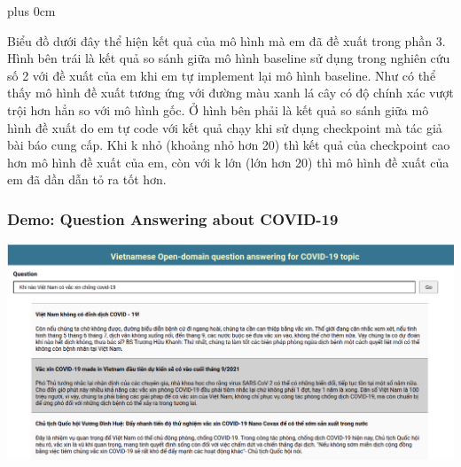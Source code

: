 \documentclass[11pt]{beamer}
\renewcommand{\raggedright}{\leftskip=0pt \rightskip=0pt plus 0cm}
\let\olditemize=\itemize
\renewenvironment{itemize}{\olditemize\raggedright}{\endlist}
\begin{document}
\begin{frame}
\begin{itemize}
	\item Biểu đồ dưới đây thể hiện kết quả của mô hình mà em đã đề xuất trong phần 3. Hình bên trái là kết quả so sánh giữa mô hình baseline sử dụng trong nghiên cứu số 2 với đề xuất của em khi em tự implement lại mô hình baseline. Như có thể thấy mô hình đề xuất tương ứng với đường màu xanh lá cây có độ chính xác vượt trội hơn hẳn so với mô hình gốc. Ở hình bên phải là kết quả so sánh giữa mô hình đề xuất do em tự code với kết quả chạy khi sử dụng checkpoint mà tác giả bài báo cung cấp. Khi k nhỏ (khoảng nhỏ hơn 20) thì kết quả của checkpoint cao hơn mô hình đề xuất của em, còn với k lớn (lớn hơn 20) thì mô hình đề xuất của em đã dần dẫn tỏ ra tốt hơn. 
\end{itemize}
\end{frame}
\begin{frame}
	\frametitle{Demo: Question Answering about COVID-19}
	\begin{adjustwidth}{-2em}{-2em}
		\includegraphics[scale=.27]{images/VNQA_2.png}
	\end{adjustwidth}
\end{frame}
\end{document}
